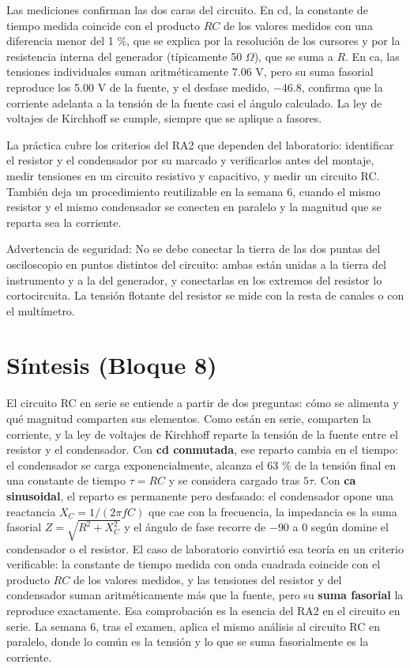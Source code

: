 \documentclass[11pt,letterpaper]{article}
\begin{document}
Las mediciones confirman las dos caras del circuito. En cd, la constante de tiempo medida coincide con el producto $RC$ de los valores medidos con una diferencia menor del 1 \%, que se explica por la resolución de los cursores y por la resistencia interna del generador (típicamente 50 \ensuremath{\Omega}), que se suma a $R$. En ca, las tensiones individuales suman aritméticamente 7.06 V, pero su suma fasorial reproduce los 5.00 V de la fuente, y el desfase medido, \ensuremath{-}46.8\textdegree{}, confirma que la corriente adelanta a la tensión de la fuente casi el ángulo calculado. La ley de voltajes de Kirchhoff se cumple, siempre que se aplique a fasores.

La práctica cubre los criterios del RA2 que dependen del laboratorio: identificar el resistor y el condensador por su marcado y verificarlos antes del montaje, medir tensiones en un circuito resistivo y capacitivo, y medir un circuito RC. También deja un procedimiento reutilizable en la semana 6, cuando el mismo resistor y el mismo condensador se conecten en paralelo y la magnitud que se reparta sea la corriente.

\begin{nota}{Advertencia de seguridad:}
No se debe conectar la tierra de las dos puntas del osciloscopio en puntos distintos del circuito: ambas están unidas a la tierra del instrumento y a la del generador, y conectarlas en los extremos del resistor lo cortocircuita. La tensión flotante del resistor se mide con la resta de canales o con el multímetro.
\end{nota}

\section{Síntesis (Bloque 8)}

El circuito RC en serie se entiende a partir de dos preguntas: cómo se alimenta y qué magnitud comparten sus elementos. Como están en serie, comparten la corriente, y la ley de voltajes de Kirchhoff reparte la tensión de la fuente entre el resistor y el condensador. Con \textbf{cd conmutada}, ese reparto cambia en el tiempo: el condensador se carga exponencialmente, alcanza el 63 \% de la tensión final en una constante de tiempo $\tau = RC$ y se considera cargado tras $5\tau$. Con \textbf{ca sinusoidal}, el reparto es permanente pero desfasado: el condensador opone una reactancia $X_C = 1/(2\pi f C)$ que cae con la frecuencia, la impedancia es la suma fasorial $Z = \sqrt{R^2 + X_C^2}$ y el ángulo de fase recorre de \ensuremath{-}90\textdegree{} a 0\textdegree{} según domine el condensador o el resistor. El caso de laboratorio convirtió esa teoría en un criterio verificable: la constante de tiempo medida con onda cuadrada coincide con el producto $RC$ de los valores medidos, y las tensiones del resistor y del condensador suman aritméticamente más que la fuente, pero su \textbf{suma fasorial} la reproduce exactamente. Esa comprobación es la esencia del RA2 en el circuito en serie. La semana 6, tras el examen, aplica el mismo análisis al circuito RC en paralelo, donde lo común es la tensión y lo que se suma fasorialmente es la corriente.
\end{document}
